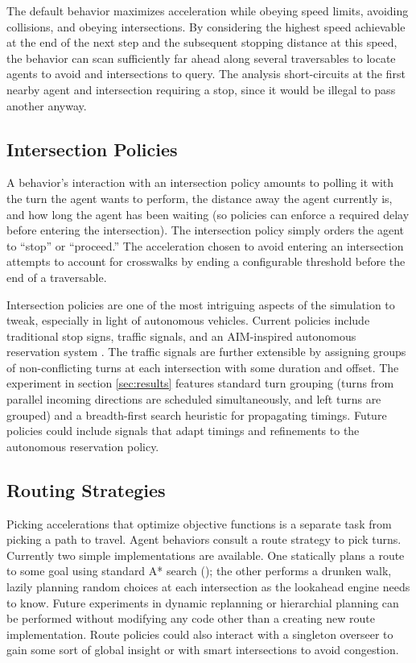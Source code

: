 \documentclass[letterpaper, 10 pt, conference]{ieeeconf}  %
\begin{document}

The default behavior maximizes acceleration while obeying speed limits,
avoiding collisions, and obeying intersections. By considering the highest speed
achievable at the end of the next step and the subsequent stopping distance at
this speed, the behavior can scan sufficiently far ahead along several
traversables to locate agents to avoid and intersections to query. The analysis
short-circuits at the first nearby agent and intersection requiring a stop,
since it would be illegal to pass another anyway.

\subsection{Intersection Policies}

A behavior's interaction with an intersection policy amounts to polling it with
the turn the agent wants to perform, the distance away the agent currently is,
and how long the agent has been waiting (so policies can enforce a required
delay before entering the intersection). The intersection policy simply orders
the agent to ``stop'' or ``proceed.'' The acceleration chosen to avoid entering
an intersection attempts to account for crosswalks by ending a configurable
threshold before the end of a traversable.

Intersection policies are one of the most intriguing aspects of the simulation
to tweak, especially in light of autonomous vehicles. Current policies include
traditional stop signs, traffic signals, and an AIM-inspired autonomous
reservation system \cite{JAIR08-dresner}. The traffic signals are further
extensible by assigning groups of non-conflicting turns at each intersection
with some duration and offset. The experiment in section \ref{sec:results}
features standard turn grouping (turns from parallel incoming directions are
scheduled simultaneously, and left turns are grouped) and a breadth-first search
heuristic for propagating timings. Future policies could include signals that
adapt timings and refinements to the autonomous reservation policy.

\subsection{Routing Strategies}

Picking accelerations that optimize objective functions is a separate task from
picking a path to travel. Agent behaviors consult a route strategy to pick
turns. Currently two simple implementations are available. One statically plans
a route to some goal using standard A* search (); the other
performs a drunken walk, lazily planning random choices at each intersection as
the lookahead engine needs to know. Future experiments in dynamic replanning or
hierarchial planning can be performed without modifying any code other than a
creating new route implementation. Route policies could also interact with a
singleton overseer to gain some sort of global insight or with smart
intersections to avoid congestion.
\end{document}
